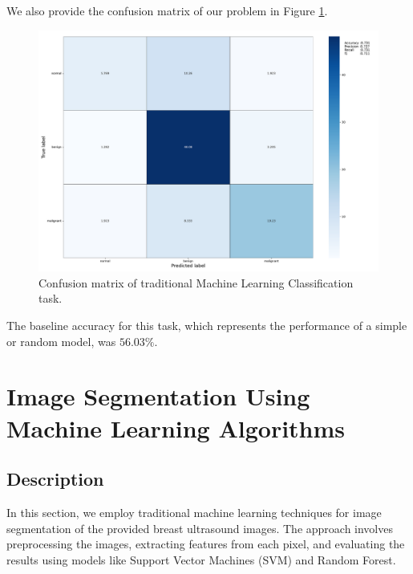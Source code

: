 We also provide the confusion matrix of our problem in Figure \ref{Figure - ML_Classification Confusion matrix}.
\begin{figure}
  \includegraphics[width=\linewidth]{Figures/Confusion_Matrix_ML_Classification.pdf}
  \caption{Confusion matrix of traditional Machine Learning Classification task.}
  \label{Figure - ML_Classification Confusion matrix}
\end{figure}

The baseline accuracy for this task, which represents the performance of a simple or random model, was $56.03\%$.


\section{Image Segmentation Using Machine Learning Algorithms}

\subsection{Description}
In this section, we employ traditional machine learning techniques for image segmentation of the provided breast ultrasound images. The approach involves preprocessing the images, extracting features from each pixel, and evaluating the results using models like Support Vector Machines (SVM) and Random Forest.

